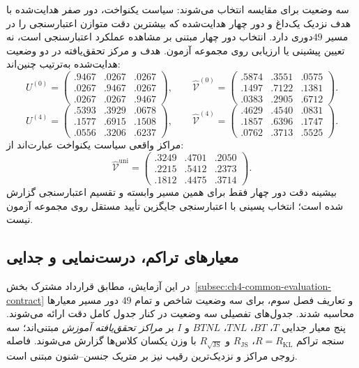 سه وضعیت برای مقایسه انتخاب می‌شوند: سیاست یکنواخت، دور صفر هدایت‌شده با هدف نزدیک یک‌داغ و دور چهار هدایت‌شده که بیشترین دقت متوازن اعتبارسنجی را در مسیر $49$دوری دارد. انتخاب دور چهار مبتنی بر مشاهده عملکرد اعتبارسنجی است، نه تعیین پیشینی یا ارزیابی روی مجموعه آزمون. هدف و مرکز تحقق‌یافته در دو وضعیت هدایت‌شده به‌ترتیب چنین‌اند:
\begin{equation}\label{eq:ch4-center-observation-target-first}
U^{(0)}=\begin{pmatrix}
.9467&.0267&.0267\\ .0267&.9467&.0267\\ .0267&.0267&.9467
\end{pmatrix},\qquad
\widehat{\mathcal V}^{(0)}=\begin{pmatrix}
.5874&.3551&.0575\\ .1497&.7122&.1381\\ .0383&.2905&.6712
\end{pmatrix}.
\end{equation}
\begin{equation}\label{eq:ch4-center-observation-target-best}
U^{(4)}=\begin{pmatrix}
.5393&.3929&.0678\\ .1577&.6915&.1508\\ .0556&.3206&.6237
\end{pmatrix},\qquad
\widehat{\mathcal V}^{(4)}=\begin{pmatrix}
.4629&.4540&.0831\\ .1857&.6396&.1747\\ .0762&.3713&.5525
\end{pmatrix}.
\end{equation}
مراکز واقعی سیاست یکنواخت عبارت‌اند از:
\begin{equation}\label{eq:ch4-center-observation-uniform}
\widehat{\mathcal V}^{\mathrm{uni}}=\begin{pmatrix}
.3249&.4701&.2050\\ .2215&.5412&.2373\\ .1812&.4475&.3714
\end{pmatrix}.
\end{equation}
بیشینه دقت دور چهار فقط برای همین مسیر وابسته و تقسیم اعتبارسنجی گزارش شده است؛ انتخاب پسینی با اعتبارسنجی جایگزین تأیید مستقل روی مجموعه آزمون نیست.

\subsection{معیارهای تراکم، درست‌نمایی و جدایی}
\label{subsec:ch4-center-observation-metrics}
در این آزمایش، مطابق قرارداد مشترک
بخش~\ref{subsec:ch4-common-evaluation-contract}
و تعاریف فصل سوم، برای سه وضعیت شاخص و تمام
$49$ دور مسیر معیارها محاسبه شدند. جدول‌های
تفصیلی سه وضعیت در کنار جدول کامل دقت ارائه می‌شوند.
پنج معیار جدایی $T$، $BT$، $TNL$، $BTNL$ و $I$
بر \emph{مراکز تحقق‌یافته آموزش} مبتنی‌اند؛
سه سنجه تراکم $R=R_{\mathrm{KL}}$،
$R_{\mathrm{JS}}$ و $R_{\sqrt{\mathrm{JS}}}$
با وزن یکسان کلاس‌ها گزارش می‌شوند.
فاصله زوجی مراکز و نزدیک‌ترین رقیب نیز
بر متریک جنسن--شنون مبتنی است.

